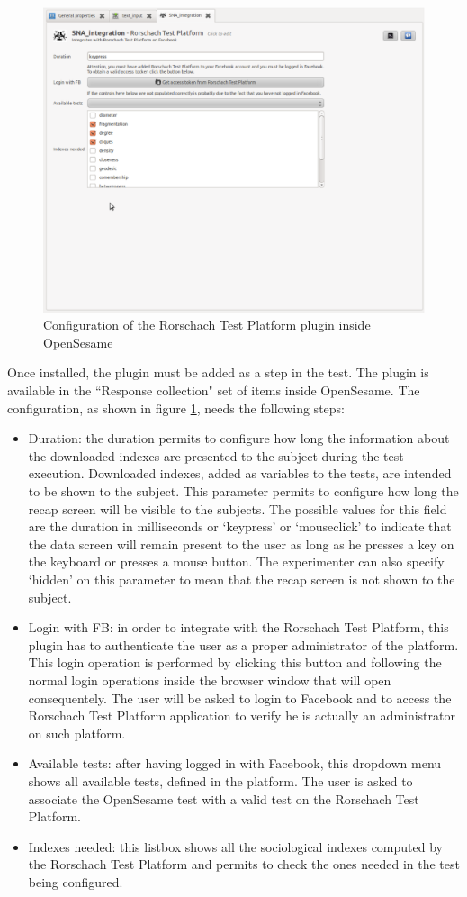 \begin{figure}[h]
\centering
\includegraphics[width=12cm]{Fig2testconfig.eps}
\caption{Configuration of the Rorschach Test Platform plugin inside OpenSesame}
\label{fig:testconfig}
\end{figure}

Once installed, the plugin must be added as a step in the test.
The plugin is available in the ``Response collection" set of items inside OpenSesame.
The configuration, as shown in figure \ref{fig:testconfig}, needs the following steps:

\begin{itemize}
\item Duration: the duration permits to configure how long the information about the downloaded indexes are presented to the subject during the test execution.
Downloaded indexes, added as variables to the tests, are intended to be shown to the subject.
This parameter permits to configure how long the recap screen will be visible to the subjects.
The possible values for this field are the duration in milliseconds or `keypress' or `mouseclick' to indicate that the data screen will remain present to the user as
long as he presses a key on the keyboard or presses a mouse button.
The experimenter can also specify `hidden' on this parameter to mean that the recap screen is not shown to the subject.
\item Login with FB: in order to integrate with the Rorschach Test Platform, this plugin has to authenticate the user as a proper administrator of the platform.
This login operation is performed by clicking this button and following the normal login operations inside the browser window that will open consequentely.
The user will be asked to login to Facebook and to access the Rorschach Test Platform application to verify he is actually an administrator on such platform.
\item Available tests: after having logged in with Facebook, this dropdown menu shows all available tests, defined in the platform.
The user is asked to associate the OpenSesame test with a valid test on the Rorschach Test Platform.
\item Indexes needed: this listbox shows all the sociological indexes computed by the Rorschach Test Platform and permits to check the ones needed in the test being configured.
\end{itemize}

